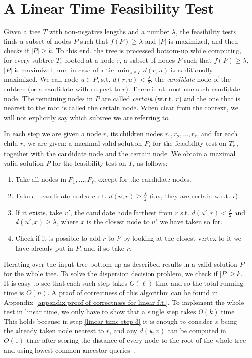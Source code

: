 \documentclass[a4paper,UKenglish]{lipics-v2016}
\theoremstyle{plain}
\begin{document}
\section{A Linear Time Feasibility Test}
\label{linear F.T.}

Given a tree $T$ with non-negative lengths and a number $\lambda$, the feasibility tests finds a subset of nodes $P$ such that $f(P)\geq\lambda$
and $|P|$ is maximized, and then checks if $|P|\geq k$.
To this end, the tree is processed bottom-up while computing, for every subtree $T_{r}$ rooted at a node $r$, a subset of nodes $P$ such that
$f(P)\geq\lambda$, $|P|$ is maximized, and in case of a tie $\min_{u\in P}d(r,u)$ is additionally maximized.
We call node $u\in P$, s.t. $d(r,u)<\frac{\lambda}{2}$, the \emph{candidate} node of the subtree (or a candidate with respect to $r$). There is at most one such candidate node.
The remaining nodes in $P$ are called \emph{certain} (w.r.t. $r$) and the one that is nearest to the root is called the certain node.
When clear from the context, we will not explicitly say which subtree we are referring to.

In each step we are given a node $r$, its children nodes $r_{1},r_{2},\ldots,r_{\ell}$, and for each child $r_{i}$ we are given: a maximal valid
solution $P_{i}$ for the feasibility test on $T_{r_{i}}$, together with the candidate node and the certain node. We obtain a maximal valid solution $P$ for the feasibility test on $T_{r}$ as follows:
\begin{enumerate}
\item Take all nodes in $P_{1},\ldots,P_{\ell}$, except for the candidate nodes.
\item Take all candidate nodes $u$ s.t. $d(u,r) \geq \frac{\lambda}{2}$ (i.e., they are certain w.r.t. $r$).
\item If it exists, take $u'$, the candidate node farthest from $r$ s.t. $d(u',r) < \frac{\lambda}{2}$ and $d(u',x)\geq \lambda$, where $x$ is the closest node to $u'$ we have taken so far.\label{linear time step 3}
\item Check if it is possible to add $r$ to $P$ by looking at the closest vertex to it we have already put in $P$, and if so take $r$.
\end{enumerate}
Iterating over the input tree bottom-up as described results in a valid solution $P$ for the whole tree. To solve the dispersion decision problem,
we check if $|P|\geq k$. It is easy to see that each such step takes $O(\ell)$ time and so the total running time is $O(n)$.
A proof of correctness of this algorithm can be found in Appendix~\ref{appendix proof of correctness for linear f.t.}.
To implement the whole test in linear time, we only have to show that a single step takes $O(k)$ time. This holds because
in step \ref{linear time step 3} it is enough to consider $x$ being the already taken node nearest to $r$, and any $d(u,v)$
can be computed in $O(1)$ time after storing the distance of every node to the root of the whole tree and using lowest common
ancestor queries~\cite{Bender2000}.
\end{document}
